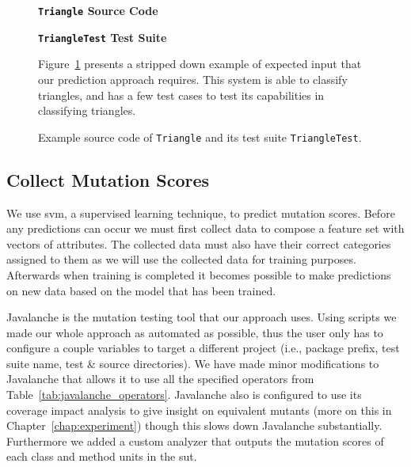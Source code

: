 \begin{figure}[h]
  \centering
  \begin{minipage}{7.25cm}
  \centering
  \footnotesize{\textbf{\texttt{Triangle} Source Code}}
  
  \end{minipage}
  \hfill
  \begin{minipage}{7.25cm}
  \centering
  \footnotesize{\textbf{\texttt{TriangleTest} Test Suite}}
  
  \end{minipage}
  \caption{Example source code of \texttt{Triangle} and its test suite \texttt{TriangleTest}.}
  \vspace{1mm}
  \footnotesize{Figure~\ref{fig:triangle_example} presents a stripped down example of expected input that our prediction approach requires. This system is able to classify triangles, and has a few test cases to test its capabilities in classifying triangles.}
  \vspace{1mm}
  \label{fig:triangle_example}
\end{figure}


\subsection{Collect Mutation Scores}
\label{subsec:approach_collect_mutation_scores}
We use \gls{svm}, a supervised learning technique, to predict mutation scores. Before any predictions can occur we must first collect data to compose a feature set with vectors of attributes. The collected data must also have their correct categories assigned to them as we will use the collected data for training purposes. Afterwards when training is completed it becomes possible to make predictions on new data based on the model that has been trained.

Javalanche is the mutation testing tool that our approach uses. Using scripts we made our whole approach as automated as possible, thus the user only has to configure a couple variables to target a different project (i.e., package prefix, test suite name, test \& source directories). We have made minor modifications to Javalanche that allows it to use all the specified operators from Table~\ref{tab:javalanche_operators}. Javalanche also is configured to use its coverage impact analysis to give insight on equivalent mutants (more on this in Chapter~\ref{chap:experiment}) though this slows down Javalanche substantially. Furthermore we added a custom analyzer that outputs the mutation scores of each class and method units in the \gls{sut}.

